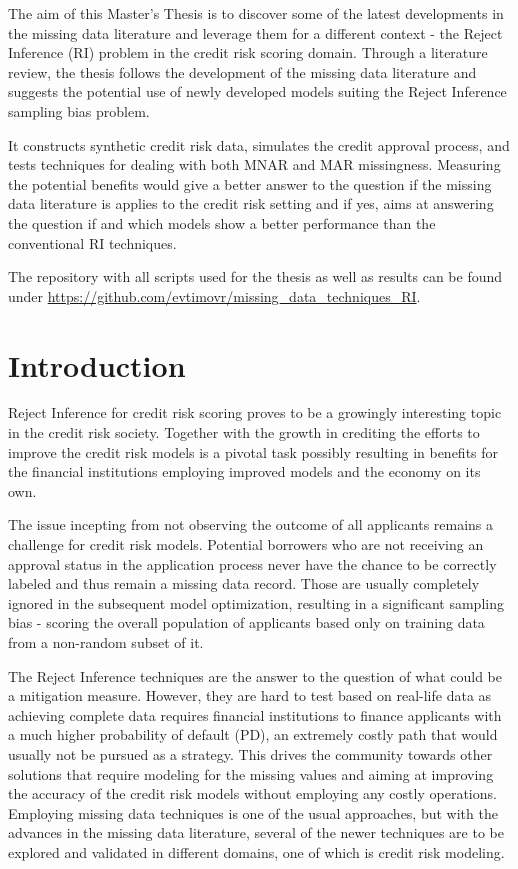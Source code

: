 \documentclass[11pt,a4paper]{article}
\begin{document}
The aim of this Master's Thesis is to discover some of the latest developments in the missing data literature and leverage them for a different context - the Reject Inference (RI) problem in the credit risk scoring domain. Through a literature review, the thesis follows the development of the missing data literature and suggests the potential use of newly developed models suiting the Reject Inference sampling bias problem.

It constructs synthetic credit risk data, simulates the credit approval process, and tests techniques for dealing with both MNAR and MAR missingness. Measuring the potential benefits would give a better answer to the question if the missing data literature is applies to the credit risk setting and if yes, aims at answering the question if and which models show a better performance than the conventional RI techniques.

The repository with all scripts used for the thesis as well as results can be found under \url{https://github.com/evtimovr/missing_data_techniques_RI}.

\newpage

\listoffigures


\newpage

\tableofcontents

\newpage

\section{Introduction}

Reject Inference for credit risk scoring proves to be a growingly interesting topic in the credit risk society. Together with the growth in crediting the efforts to improve the credit risk models is a pivotal task possibly resulting in benefits for the financial institutions employing improved models and the economy on its own. 

The issue incepting from not observing the outcome of all applicants remains a challenge for credit risk models. Potential borrowers who are not receiving an approval status in the application process never have the chance to be correctly labeled and thus remain a missing data record. Those are usually completely ignored in the subsequent model optimization, resulting in a significant sampling bias - scoring the overall population of applicants based only on training data from a non-random subset of it. 

The Reject Inference techniques are the answer to the question of what could be a mitigation measure. However, they are hard to test based on real-life data as achieving complete data requires financial institutions to finance applicants with a much higher probability of default (PD), an extremely costly path that would usually not be pursued as a strategy. This drives the community towards other solutions that require modeling for the missing values and aiming at improving the accuracy of the credit risk models without employing any costly operations. Employing missing data techniques is one of the usual approaches, but with the advances in the missing data literature, several of the newer techniques are to be explored and validated in different domains, one of which is credit risk modeling. 
\end{document}
